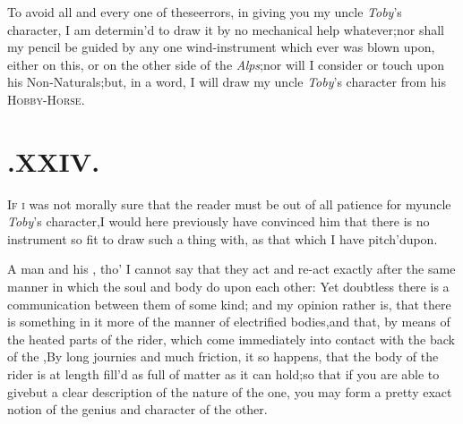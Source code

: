 \documentclass{article}
\begin{document}
To avoid all and every one of these\break errors, in giving you my
uncle \textit{Toby}’s character, I am determin’d to draw it
by
no mechanical help whatever;\tsh  nor shall my pencil be guided by
any one wind-instrument which ever was blown upon, either on this,
or on the other side of the \textit{Alps};\tsk  nor will I
consider\break
{}
or touch upon his
Non-Naturals;\tsk but, in a word, I will draw my uncle
\textit{Toby}’s character from his
\textsc{Hobby-Horse}.

\bigskip

\section{.\enspace XXIV.}

\lettrine{I}{f i} was not morally sure that the
reader must be out of all patience for my\break uncle \textit{Toby}’s
character,\tsh  I would here previously have convinced him
that there is no instrument so fit to draw such a thing with, as
that which I have pitch’d\break upon.\\

A man and his ,\break
tho’ I cannot say that they act and re-act exactly after the
same manner in which the soul and body do upon each other: Yet
doubtless there is a communication between them of some kind; and
my opinion rather is, that there is something in it more of the
manner of electrified bodies,\tsk  and that, by means of the
heated parts of the rider, which come immediately into contact with
the back of the ,\tsk  By
long journies and much friction, it so happens, that the body of
the rider is at length fill’d as full of
 matter as it can
hold;\tsk  so that if you are able to give\break but a clear description of the nature
of the one, you may form a pretty exact notion of the genius and
character of the other.\\
\end{document}
